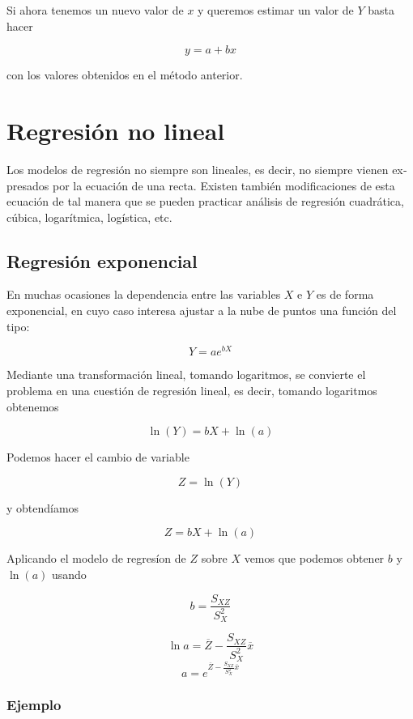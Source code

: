 \documentclass[
]{article}
\begin{document}
Si ahora tenemos un nuevo valor de \(x\) y queremos estimar un valor de
\(Y\) basta hacer

\[y = a + b x\]

con los valores obtenidos en el método anterior.

\hypertarget{regresiuxf3n-no-lineal}{%
\section{Regresión no lineal}\label{regresiuxf3n-no-lineal}}

Los modelos de regresión no siempre son lineales, es decir, no siempre
vienen ex­presados por la ecuación de una recta. Existen también
modificaciones de esta ecuación de tal manera que se pueden practicar
análisis de regresión cuadrática, cúbica, logarít­mica, logística, etc.

\hypertarget{regresiuxf3n-exponencial}{%
\subsection{Regresión exponencial}\label{regresiuxf3n-exponencial}}

En muchas ocasiones la dependencia entre las variables \(X\) e \(Y\) es
de forma exponencial, en cuyo caso interesa ajustar a la nube de puntos
una función del tipo:

\[Y=ae^{bX}\]

Mediante una transformación lineal, tomando logaritmos, se convierte el
problema en una cuestión de regresión lineal, es decir, tomando
logaritmos obtenemos

\[\ln {(Y)}=bX+\ln {(a)}\]

Podemos hacer el cambio de variable

\[Z=\ln(Y)\]

y obtendíamos

\[Z = bX + \ln(a)\]

Aplicando el modelo de regresíon de \(Z\) sobre \(X\) vemos que podemos
obtener \(b\) y \(\ln(a)\) usando

\[b = \frac{S_{XZ}}{S^2_X}\]

\[\ln a = \overline{Z} - \frac{S_{XZ}}{S^2_X} \overline x\]
\[a = e^{ \overline{Z} - \frac{S_{XZ}}{S^2_X} \overline x}\]

\hypertarget{ejemplo-4}{%
\subsubsection{Ejemplo}\label{ejemplo-4}}
\end{document}
